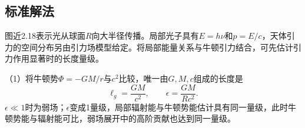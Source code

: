 \documentclass[UTF8,fontset=fandol,a4paper,11pt]{ctexart}
\begin{document}


\subsection*{标准解法}


图近2.18表示光从球面$R$向大半径传播。局部光子具有$E=h\nu$和$p=E/c$，天体引力的空间分布另由引力场模型给定。将局部能量关系与牛顿引力结合，可先估计引力作用显著时的长度量级。

（1）将牛顿势$\Phi=-GM/r$与$c^2$比较，唯一由$G,M,c$组成的长度是
\[
\boxed{\ell_g=\frac{GM}{c^2}},\qquad
\epsilon=\frac{GM}{Rc^2}.
\]
$\epsilon\ll1$时为弱场；$\epsilon$变成1量级，局部辐射能与牛顿势能估计具有同一量级，此时牛顿势能与辐射能可比，弱场展开中的高阶贡献也达到同一量级。
\end{document}
